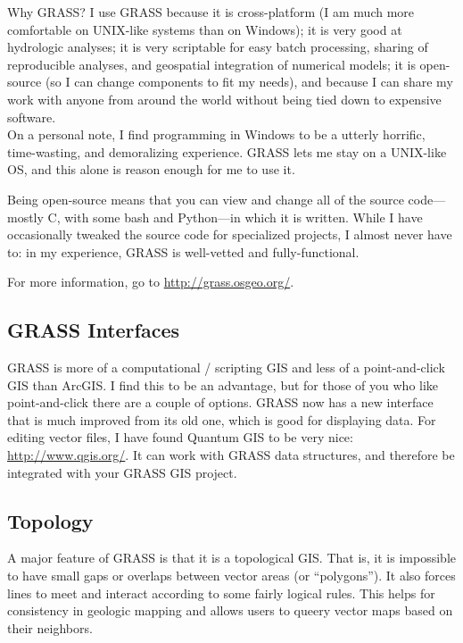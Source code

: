\documentclass{book}
\begin{document}
\begin{boxx}[!ht]
\begin{bclogo}[arrondi = 0.1, logo = \bcrosevents]{Why GRASS?}
I use GRASS because it is cross-platform (I am much more comfortable on UNIX-like systems than on Windows); it is very good at hydrologic analyses; it is very scriptable for easy batch processing, sharing of reproducible analyses, and geospatial integration of numerical models; it is open-source (so I can change components to fit my needs), and because I can share my work with anyone from around the world without being tied down to expensive software. \\

On a personal note, I find programming in Windows to be a utterly horrific, time-wasting, and demoralizing experience. GRASS lets me stay on a UNIX-like OS, and this alone is reason enough for me to use it.
\end{bclogo}
\caption{Why GRASS?}
\end{boxx}

Being open-source means that you can view and change all of the source code---mostly C, with some bash and Python---in which it is written. While I have occasionally tweaked the source code for specialized projects, I almost never have to: in my experience, GRASS is well-vetted and fully-functional.

For more information, go to \url{http://grass.osgeo.org/}.

\subsection{GRASS Interfaces}

GRASS is more of a computational / scripting GIS and less of a point-and-click GIS than ArcGIS. I find this to be an advantage, but for those of you who like point-and-click there are a couple of options. GRASS now has a new interface that is much improved from its old one, which is good for displaying data. For editing vector files, I have found Quantum GIS to be very nice: \url{http://www.qgis.org/}. It can work with GRASS data structures, and therefore be integrated with your GRASS GIS project.

\subsection{Topology}

A major feature of GRASS is that it is a topological GIS. That is, it is impossible to have small gaps or overlaps between vector areas (or ``polygons''). It also forces lines to meet and interact according to some fairly logical rules. This helps for consistency in geologic mapping and allows users to queery vector maps based on their neighbors.
\end{document}
